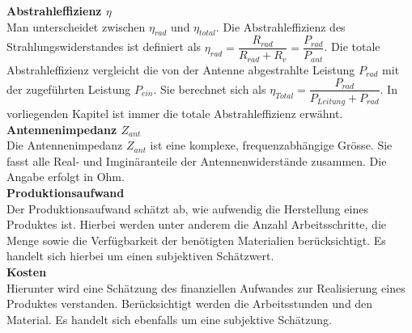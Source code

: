 \textbf{Abstrahleffizienz $\eta$}\\
Man unterscheidet zwischen $\eta_{rad}$ und $\eta_{total}$. Die Abstrahleffizienz des Strahlungswiderstandes ist definiert als $\eta_{rad}=\dfrac{R_{rad}}{R_{rad}+R_v}=\dfrac{P_{rad}}{P_{ant}}$. Die totale Abstrahleffizienz vergleicht die von der Antenne abgestrahlte Leistung $P_{rad}$ mit der zugeführten Leistung $P_{ein}$. Sie berechnet sich als $\eta_{Total}=\dfrac{P_{rad}}{P_{Leitung}+P_{rad}}$. In vorliegenden Kapitel ist immer die totale Abstrahleffizienz erwähnt.\\

\textbf{Antennenimpedanz $Z_{ant}$}\\
Die Antennenimpedanz $Z_{ant}$ ist eine komplexe, frequenzabhängige  Grösse. Sie fasst alle Real- und Imginäranteile der Antennenwiderstände zusammen. Die Angabe erfolgt in Ohm.\\

\textbf{Produktionsaufwand}\\
Der Produktionsaufwand schätzt ab, wie aufwendig die Herstellung eines Produktes ist. Hierbei werden unter anderem die Anzahl Arbeitsschritte, die Menge sowie die Verfügbarkeit der benötigten Materialien berücksichtigt. Es handelt sich hierbei um einen subjektiven Schätzwert.\\

\textbf{Kosten}\\
Hierunter wird eine Schätzung des finanziellen Aufwandes zur Realisierung eines Produktes verstanden. Berücksichtigt werden die Arbeitsstunden und den Material. Es handelt sich ebenfalls um eine subjektive Schätzung.  
\newpage 
\thispagestyle{empty}

